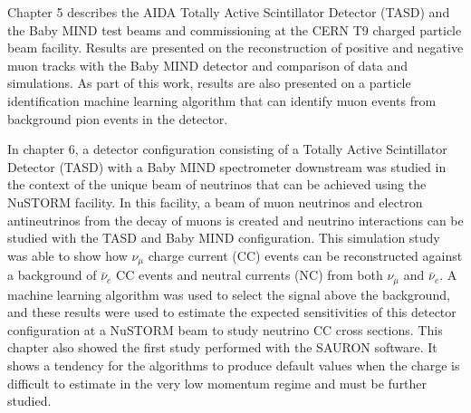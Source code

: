 
Chapter 5 describes the AIDA Totally Active Scintillator Detector (TASD) and the Baby MIND test beams and commissioning at the CERN T9 charged particle beam facility. Results are presented on the reconstruction of positive and negative muon tracks with the Baby MIND detector and comparison of data and simulations. As part of this work, results are also presented on a particle identification machine learning algorithm that can identify muon events from background pion events in the detector.


In chapter 6, a detector configuration consisting of a Totally Active Scintillator Detector (TASD) with a Baby MIND spectrometer downstream was studied in the context of the unique beam of neutrinos that can be achieved using the NuSTORM facility. In this facility, a beam of muon neutrinos and electron antineutrinos from the decay of muons is created and neutrino interactions can be studied with the TASD and Baby MIND configuration. This simulation study was able to show how $\nu_\mu$ charge current (CC) events can be reconstructed against a background of $\bar{\nu}_e$ CC events and neutral currents (NC) from both $\nu_\mu$ and $\bar{\nu}_e$. A machine learning algorithm was used to select the signal above the background, and these results were used to estimate the expected sensitivities of this detector configuration at a NuSTORM beam to study neutrino CC cross sections.  This chapter also showed the first study performed with the SAURON software. It shows a tendency for the algorithms to produce default values when the charge is difficult to estimate in the very low momentum regime and must be further studied.


